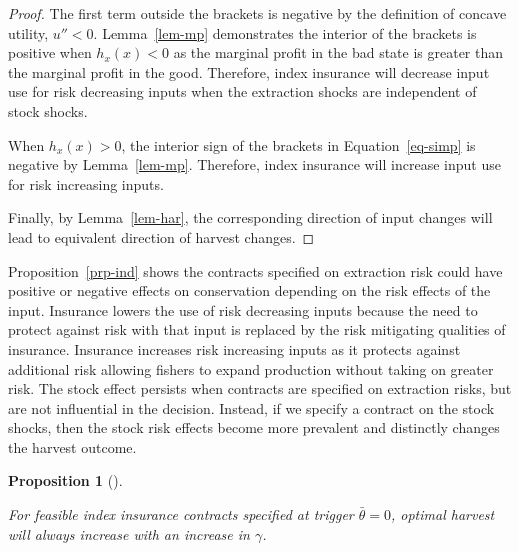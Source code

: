 \documentclass[
  letterpaper,
  DIV=11,
  numbers=noendperiod]{scrartcl}
\theoremstyle{plain}
\theoremstyle{plain}
\newtheorem{proposition}{Proposition}[section]
\theoremstyle{remark}
\begin{document}
\begin{proof}
The first term outside the brackets is negative by the definition of
concave utility, \(u''<0\). Lemma~\ref{lem-mp} demonstrates the interior
of the brackets is positive when \(h_x(x)<0\) as the marginal profit in
the bad state is greater than the marginal profit in the good.
Therefore, index insurance will decrease input use for risk decreasing
inputs when the extraction shocks are independent of stock shocks.

When \(h_x(x)>0\), the interior sign of the brackets in
Equation~\ref{eq-simp} is negative by Lemma~\ref{lem-mp}. Therefore,
index insurance will increase input use for risk increasing inputs.

Finally, by Lemma~\ref{lem-har}, the corresponding direction of input
changes will lead to equivalent direction of harvest changes.
\end{proof}

Proposition~\ref{prp-ind} shows the contracts specified on extraction
risk could have positive or negative effects on conservation depending
on the risk effects of the input. Insurance lowers the use of risk
decreasing inputs because the need to protect against risk with that
input is replaced by the risk mitigating qualities of insurance.
Insurance increases risk increasing inputs as it protects against
additional risk allowing fishers to expand production without taking on
greater risk. The stock effect persists when contracts are specified on
extraction risks, but are not influential in the decision. Instead, if
we specify a contract on the stock shocks, then the stock risk effects
become more prevalent and distinctly changes the harvest outcome.

\begin{proposition}[]\protect\hypertarget{prp-theta}{}\label{prp-theta}

For feasible index insurance contracts specified at trigger
\(\bar\theta=0\), optimal harvest will always increase with an increase
in \(\gamma\).

\end{proposition}
\end{document}
